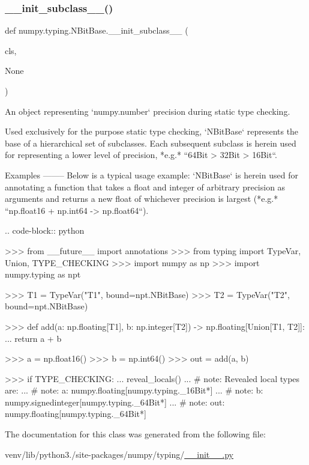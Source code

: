 \subsubsection{\texorpdfstring{\+\_\+\+\_\+init\+\_\+subclass\+\_\+\+\_\+()}{\_\_init\_subclass\_\_()}}
{\footnotesize\ttfamily def numpy.\+typing.\+N\+Bit\+Base.\+\_\+\+\_\+init\+\_\+subclass\+\_\+\+\_\+ (\begin{DoxyParamCaption}\item[{}]{cls,  }\item[{}]{None }\end{DoxyParamCaption})}

\begin{DoxyVerb}An object representing `numpy.number` precision during static type checking.

Used exclusively for the purpose static type checking, `NBitBase`
represents the base of a hierarchical set of subclasses.
Each subsequent subclass is herein used for representing a lower level
of precision, *e.g.* ``64Bit > 32Bit > 16Bit``.

Examples
--------
Below is a typical usage example: `NBitBase` is herein used for annotating a
function that takes a float and integer of arbitrary precision as arguments
and returns a new float of whichever precision is largest
(*e.g.* ``np.float16 + np.int64 -> np.float64``).

.. code-block:: python

>>> from __future__ import annotations
>>> from typing import TypeVar, Union, TYPE_CHECKING
>>> import numpy as np
>>> import numpy.typing as npt

>>> T1 = TypeVar("T1", bound=npt.NBitBase)
>>> T2 = TypeVar("T2", bound=npt.NBitBase)

>>> def add(a: np.floating[T1], b: np.integer[T2]) -> np.floating[Union[T1, T2]]:
...     return a + b

>>> a = np.float16()
>>> b = np.int64()
>>> out = add(a, b)

>>> if TYPE_CHECKING:
...     reveal_locals()
...     # note: Revealed local types are:
...     # note:     a: numpy.floating[numpy.typing._16Bit*]
...     # note:     b: numpy.signedinteger[numpy.typing._64Bit*]
...     # note:     out: numpy.floating[numpy.typing._64Bit*]\end{DoxyVerb}
 

The documentation for this class was generated from the following file\+:\begin{DoxyCompactItemize}
\item 
venv/lib/python3./site-\/packages/numpy/typing/\hyperlink{venv_2lib_2python3_89_2site-packages_2numpy_2typing_2____init_____8py}{\+\_\+\+\_\+init\+\_\+\+\_\+.\+py}\end{DoxyCompactItemize}
